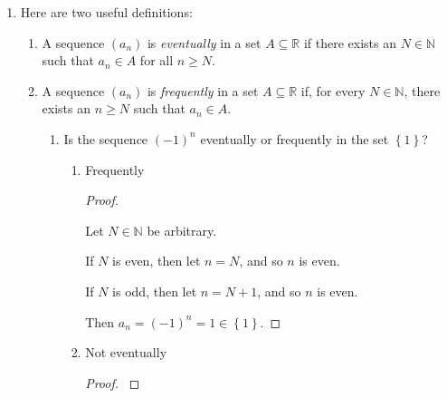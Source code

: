 \documentclass[12pt]{article}
\newcommand{\RR}{\mathbb{R}} %
\newcommand{\NN}{\mathbb{N}}
\newcommand\set[1]{\left\lbrace #1 \right\rbrace} %
\newcommand\abs[1]{\left| #1 \right|} %
\newcommand{\eps}{\varepsilon}
\begin{document}
\begin{enumerate}
\begin{proof}
$ $

Let $\eps > 0$ be arbitrary.

Suppose $a, b \in \RR$ and $\lim a_n = a$ and $\lim a_n = b$.

Then there exists $n_1 \in \NN$ such that for all $n \ge n_1, \abs{a_n - a} < \frac{\eps}{2}$.

Then there exists $n_2 \in \NN$ such that for all $n \ge n_2, \abs{a_n - b} < \frac{\eps}{2}$.

Let $n_0 = \max \set{n_1, n_2}$.

Then for all $n \ge n_0, \abs{a - b} = \abs{a - a_n + a_n - b} \le \abs{a_n - a} + \abs{a_n - b}
\\
< \frac{\eps}{2} + \frac{\eps}{2} = \eps$.

Thus, $a - b = 0$, and so $a = b$.
\end{proof}

\item Here are two useful definitions:
\begin{enumerate}
\item A sequence $(a_n)$ is \textit{eventually} in a set $A \subseteq \RR$ if there exists an $N \in \NN$ such that $a_n \in A$ for all $n \ge N$.

\item A sequence $(a_n)$ is \textit{frequently} in a set $A \subseteq \RR$ if, for every $N \in \NN$, there exists an $n \ge N$ such that $a_n \in A$.

\begin{enumerate}
\item Is the sequence $(-1)^n$ eventually or frequently in the set $\set{1}$?

\begin{enumerate}
\item
Frequently

\begin{proof}
$ $

Let $N \in \NN$ be arbitrary.

If $N$ is even, then let $n = N$, and so $n$ is even.

If $N$ is odd, then let $n = N + 1$, and so $n$ is even.

Then $a_n = (-1)^n = 1 \in \set{1}$.
\end{proof}

\item
Not eventually

\begin{proof}
$ $


\end{proof}
\end{enumerate}
\end{enumerate}
\end{enumerate}
\end{enumerate}
\end{document}
